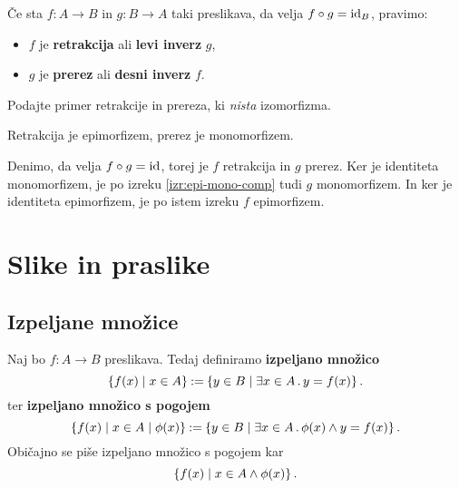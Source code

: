 \begin{definicija}
  Če sta $f : A \to B$ in $g : B \to A$ taki preslikava, da velja $f \circ g = \id[B]$, pravimo:
  \begin{itemize}
  \item $f$ je \textbf{retrakcija} ali \textbf{levi inverz} $g$,
  \item $g$ je \textbf{prerez} ali \textbf{desni inverz} $f$.
  \end{itemize}
\end{definicija}

\begin{naloga}
  Podajte primer retrakcije in prereza, ki \emph{nista} izomorfizma.
\end{naloga}

\begin{izrek}
  Retrakcija je epimorfizem, prerez je monomorfizem.
\end{izrek}

\begin{dokaz}
  Denimo, da velja $f \circ g = \id$, torej je $f$ retrakcija in $g$ prerez. Ker je identiteta monomorfizem, je po izreku \ref{izr:epi-mono-comp} tudi $g$ monomorfizem. In ker je identiteta epimorfizem, je po istem izreku $f$ epimorfizem.
\end{dokaz}

\section{Slike in praslike}

\subsection{Izpeljane množice}

Naj bo $f : A \to B$ preslikava. Tedaj definiramo \textbf{izpeljano množico}
%
\begin{equation*}
  \set{ f(x) \such x \in A }
  \defeq \set{ y \in B \such \some{x \in A} y = f(x) }.
\end{equation*}
%
ter \textbf{izpeljano množico s pogojem}
%
\begin{equation*}
  \set{ f(x) \such x \in A \such \phi(x) }
  \defeq \set{ y \in B \such \some{x \in A} \phi(x) \land y = f(x) }.
\end{equation*}
%
Običajno se piše izpeljano množico s pogojem kar
%
\begin{equation*}
  \set{ f(x) \such x \in A \land \phi(x) }.
\end{equation*}

